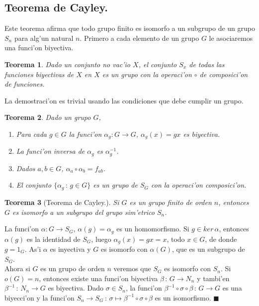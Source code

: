 \documentclass[a4paper,openright,12pt]{book}
\numberwithin{equation}{section} %
\newtheorem{teorema}{Teorema}[section] %
\newenvironment{proof}{\noindent{\it Demostracion:}}{\hfill$\blacksquare$} %
\begin{document}
\subsection{Teorema de Cayley.}
Este teorema afirma que todo grupo finito es isomorfo a un subgrupo de un grupo $S_{n}$ para alg'un natural $n$. Primero a cada elemento de un grupo $G$  le asociaremos una funci'on biyectiva.
\begin{teorema}
Dado un conjunto no vac'io $X$, el conjunto $S_{x}$ de todas las funciones biyectivas de $X$ en $X$ es un grupo con la operaci'on $\circ$ de composici'on de funciones.
\end{teorema}
La demostraci'on es trivial usando las condiciones que debe cumplir un grupo.
\begin{teorema}
Dado un grupo $G$,
\begin{enumerate}
\item Para cada $g \in G$ la funci'on $\alpha_{g}:G \rightarrow G$, $\alpha_{g}(x)=gx$ es biyectiva.
\item La funci'on inversa de $\alpha_{g}$ es $\alpha_{g}^{-1}$.
\item Dados $a,b \in G$, $\alpha_{a}\circ \alpha_{b}=f_{ab}$.
\item El conjunto $\{ \alpha_{g}\,:\,g \in G\}$ es un grupo de $S_{G}$ con la operaci'on composici'on.
\end{enumerate}
\end{teorema}
\begin{teorema}[Teorema de Cayley.]
Si $G$ es un grupo finito de orden $n$, entonces $G$ es isomorfo a un subgrupo del grupo sim'etrico $S_{n}$.
\end{teorema}
\begin{proof}
La funci'on $\alpha : G \rightarrow S_{G}$, $\alpha (g)=\alpha_{g}$ es un homomorfismo. Si $g \in ker \, \alpha$, entonces $\alpha (g)$ es la identidad de $S_{G}$, luego $\alpha_{g}(x)=gx=x$, todo $x \in G$, de donde $g=1_{G}$. As'i $\alpha$ es inyectiva y $G$ es isomorfo con $\alpha (G)$, que es un subgrupo de $S_{G}$.\\
Ahora si $G$ es un grupo de orden $n$ veremos que $S_{G}$ es isomorfo con $S_{n}$. Si $o(G)=n$, entonces existe una funci'on biyectiva $\beta \, : \, G \rightarrow N_{n}$ y tambi'en $\beta^{-1}\,:\,N_{n}\rightarrow G$ es biyectiva. Dado $\sigma \in S_{n}$, la funci'on $\beta^{-1}\circ \sigma \circ \beta \,:\, G \rightarrow G$ es una biyecci'on y la funci'on $S_{n}\rightarrow S_{G}\,:\,\sigma \mapsto \beta^{-1}\circ \sigma \circ \beta$ es un isomorfismo.
\end{proof}
\end{document}
